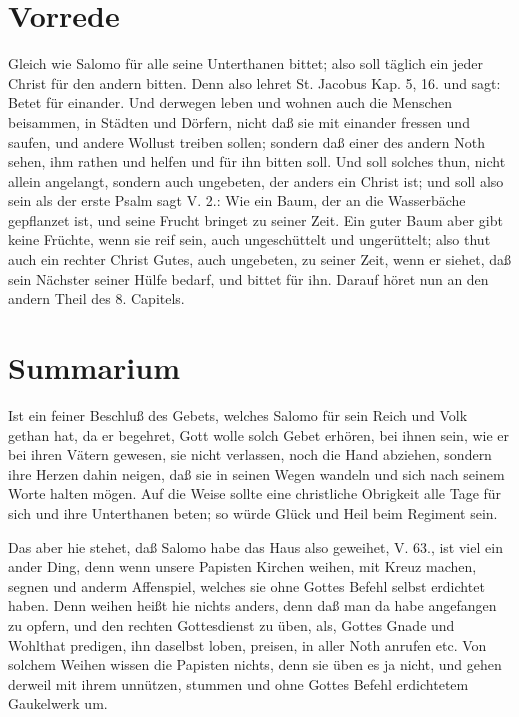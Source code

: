\section{Vorrede}

Gleich wie Salomo für alle seine Unterthanen bittet; also soll täglich ein jeder Christ für den andern bitten. Denn also lehret St. Jacobus Kap. 5, 16. und sagt: Betet für einander. Und derwegen leben und wohnen auch die Menschen beisammen, in Städten und Dörfern, nicht daß sie mit einander fressen und saufen, und andere Wollust treiben sollen; sondern daß einer des andern Noth sehen, ihm rathen und helfen und für ihn bitten soll. Und soll solches thun, nicht allein angelangt, sondern auch ungebeten, der anders ein Christ ist; und soll also sein als der erste Psalm sagt V. 2.: Wie ein Baum, der an die Wasserbäche gepflanzet ist, und seine Frucht bringet zu seiner Zeit. Ein guter Baum aber gibt keine Früchte, wenn sie reif sein, auch ungeschüttelt und ungerüttelt; also thut auch ein rechter Christ Gutes, auch ungebeten, zu seiner Zeit, wenn er siehet, daß sein Nächster seiner Hülfe bedarf, und bittet für ihn. Darauf höret nun an den andern Theil des 8. Capitels.

\section{Summarium}

Ist ein feiner Beschluß des Gebets, welches Salomo für sein Reich und Volk gethan hat, da er begehret, Gott wolle solch Gebet erhören, bei ihnen sein, wie er bei ihren Vätern gewesen, sie nicht verlassen, noch die Hand abziehen, sondern ihre Herzen dahin neigen, daß sie in seinen Wegen wandeln und sich nach seinem Worte halten mögen. Auf die Weise sollte eine christliche Obrigkeit alle Tage für sich und ihre Unterthanen beten; so würde Glück und Heil beim Regiment sein.

Das aber hie stehet, daß Salomo habe das Haus also geweihet, V. 63., ist viel ein ander Ding, denn wenn unsere Papisten Kirchen weihen, mit Kreuz machen, segnen und anderm Affenspiel, welches sie ohne Gottes Befehl selbst erdichtet haben. Denn weihen heißt hie nichts anders, denn daß man da habe angefangen zu opfern, und den rechten Gottesdienst zu üben, als, Gottes Gnade und Wohlthat predigen, ihn daselbst loben, preisen, in aller Noth anrufen etc. Von solchem Weihen wissen die Papisten nichts, denn sie üben es ja nicht, und gehen derweil mit ihrem unnützen, stummen und ohne Gottes Befehl erdichtetem Gaukelwerk um.


